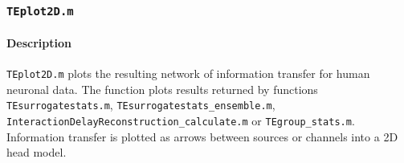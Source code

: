 \documentclass[a4paper,10pt]{article}
\begin{document}
% 
% 
% 
% 

\subsubsection{\texttt{TEplot2D.m}}

\paragraph*{Description} \texttt{TEplot2D.m} plots the resulting network of information transfer for human neuronal data. The function plots results returned by functions \texttt{TEsurrogatestats.m}, \texttt{TEsurrogatestats\_ensemble.m}, \texttt{InteractionDelayReconstruction\_calculate.m} or \texttt{TEgroup\_stats.m}. Information transfer is plotted as arrows between sources or channels into a 2D head model.
\end{document}
